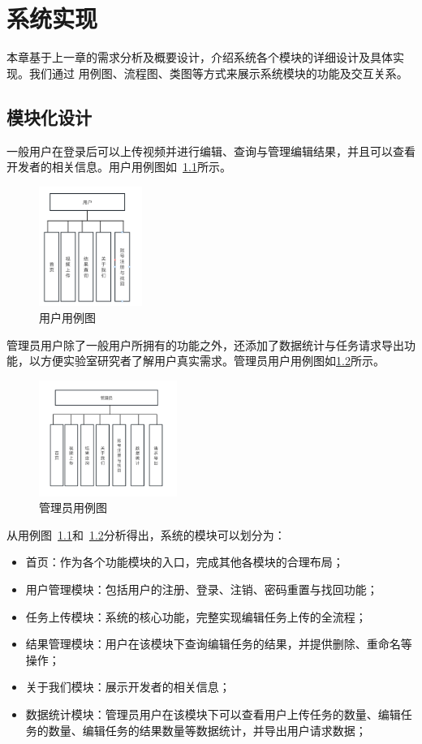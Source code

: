 \chapter{系统实现}

本章基于上一章的需求分析及概要设计，介绍系统各个模块的详细设计及具体实现。我们通过
用例图、流程图、类图等方式来展示系统模块的功能及交互关系。

\section{模块化设计}

一般用户在登录后可以上传视频并进行编辑、查询与管理编辑结果，并且可以查看开发者的相关信息。用户用例图如~\ref{fig:user-uml}所示。
\begin{figure}[ht]
    \centering
    \includegraphics[width=0.3\textwidth]{source/img/user_uml.png}
    \caption{用户用例图}
    \label{fig:user-uml}
\end{figure}
管理员用户除了一般用户所拥有的功能之外，还添加了数据统计与任务请求导出功能，以方便实验室研究者了解用户真实需求。管理员用户用例图如\ref{fig:admin-uml}所示。
\begin{figure}[ht]
    \centering
    \includegraphics[width=0.4\textwidth]{source/img/admin_uml.png}
    \caption{管理员用例图}
    \label{fig:admin-uml}
\end{figure}

从用例图~\ref{fig:user-uml}和~\ref{fig:admin-uml}分析得出，系统的模块可以划分为：
\begin{itemize}
    \item 首页：作为各个功能模块的入口，完成其他各模块的合理布局；
    \item 用户管理模块：包括用户的注册、登录、注销、密码重置与找回功能；
    \item 任务上传模块：系统的核心功能，完整实现编辑任务上传的全流程；
    \item 结果管理模块：用户在该模块下查询编辑任务的结果，并提供删除、重命名等操作；
    \item 关于我们模块：展示开发者的相关信息；
    \item 数据统计模块：管理员用户在该模块下可以查看用户上传任务的数量、编辑任务的数量、编辑任务的结果数量等数据统计，并导出用户请求数据；
\end{itemize}

